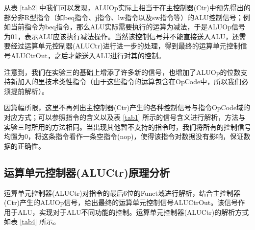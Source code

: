 \documentclass{cumcm}
\numberwithin{equation}{section}
\numberwithin{equation}{subsection}
\begin{document}
从表 \ref{tab2} 中我们可以发现，ALUOp实际上相当于在主控制器(Ctr)中预先得出的部分非R型指令（如beq指令、j指令、lw指令以及sw指令等）的ALU控制信号；例如当前指令为beq指令，那么ALU实际需要执行的运算为减法，于是ALUOp信号为01，表示ALU应该执行减法操作。当然该控制信号并不能直接送入ALU，还需要经过运算单元控制器(ALUCtr)进行进一步的处理，得到最终的运算单元控制信号ALUCtrOut，之后才能送入ALU进行对其的控制。

注意到，我们在实验三的基础上增添了许多新的信号，也增加了ALUOp的位数支持新加入的里技术类性指令（由于这些指令的运算包含在OpCode中，所以我们必须提前解析）。

因篇幅所限，这里不再列出主控制器(Ctr)产生的各种控制信号与指令OpCode域的对应方式；可以参照指令的含义以及表 \ref{tab1} 所示的信号含义进行解析，方法与实验三时所用的方法相同。当出现其他暂不支持的指令时，我们将所有的控制信号均置为0，将这条指令看作一条空指令(nop)，使得该指令对数据没有影响，保证数据的正确性。

\subsection{运算单元控制器(ALUCtr)原理分析}\label{section2.2}

运算单元控制器(ALUCtr)对指令的最后6位的Funct域进行解析，结合主控制器(Ctr)产生的ALUOp信号，给出最终的运算单元控制信号ALUCtrOut。该信号作用于ALU，实现对于ALU不同功能的控制。运算单元控制器(ALUCtr)的解析方式如表 \ref{tab4} 所示。
\end{document}

